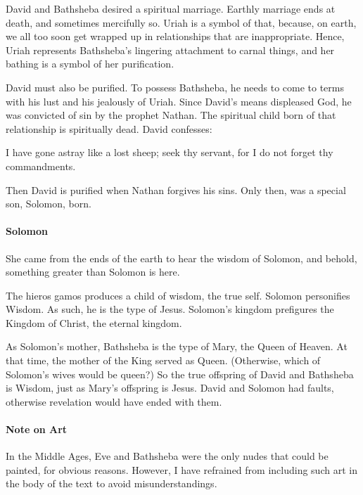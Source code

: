 David and Bathsheba desired a spiritual marriage. Earthly marriage ends at death, and sometimes mercifully so. Uriah is a symbol of that, because, on earth, we all too soon get wrapped up in relationships that are inappropriate. Hence, Uriah represents Bathsheba's lingering attachment to carnal things, and her bathing is a symbol of her purification.

David must also be purified. To possess Bathsheba, he needs to come to terms with his lust and his jealously of Uriah. Since David's means displeased God, he was convicted of sin by the prophet Nathan. The spiritual child born of that relationship is spiritually dead. David confesses:

\begin{quotex}
I have gone astray like a lost sheep; seek thy servant, for I do not forget thy commandments. 

\end{quotex}
Then David is purified when Nathan forgives his sins. Only then, was a special son, Solomon, born.

\paragraph{Solomon}

\begin{quotex}
She came from the ends of the earth to hear the wisdom of Solomon, and behold, something greater than Solomon is here. 
\end{quotex}

The hieros gamos produces a child of wisdom, the true self. Solomon personifies Wisdom. As such, he is the type of Jesus. Solomon's kingdom prefigures the Kingdom of Christ, the eternal kingdom.

As Solomon's mother, Bathsheba is the type of Mary, the Queen of Heaven. At that time, the mother of the King served as Queen. (Otherwise, which of Solomon's wives would be queen?) So the true offspring of David and Bathsheba is Wisdom, just as Mary's offspring is Jesus. David and Solomon had faults, otherwise revelation would have ended with them.


\hfill



\paragraph{Note on Art} In the Middle Ages, Eve and Bathsheba were the only nudes that could be painted, for obvious reasons. However, I have refrained from including such art in the body of the text to avoid misunderstandings.



